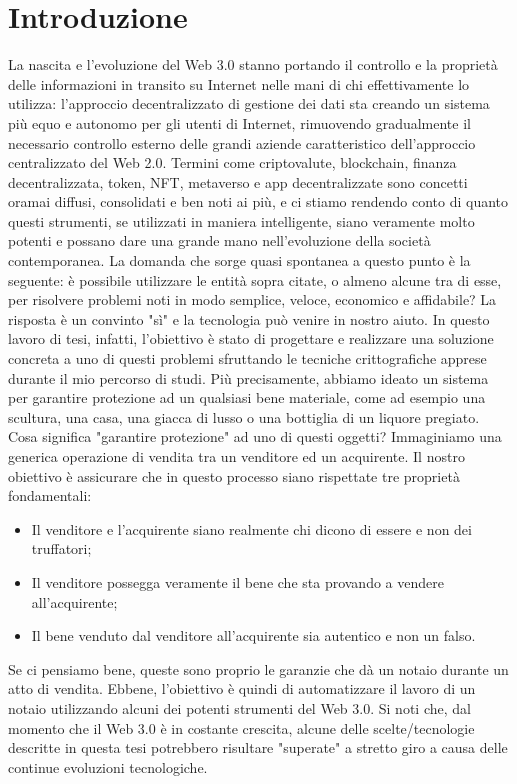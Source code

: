 \documentclass[12pt]{report}
\begin{document}
\chapter{Introduzione}
\noindent
La nascita e l'evoluzione del Web 3.0 stanno portando il controllo e la proprietà delle informazioni in transito su Internet nelle mani di chi effettivamente lo utilizza: l'approccio decentralizzato di gestione dei dati sta creando un sistema più equo e autonomo per gli utenti di Internet, rimuovendo gradualmente il necessario controllo esterno delle grandi aziende caratteristico dell'approccio centralizzato del Web 2.0.\newline
Termini come criptovalute, blockchain, finanza decentralizzata, token, NFT, metaverso e app decentralizzate sono concetti oramai diffusi, consolidati e ben noti ai più, e ci stiamo rendendo conto di quanto questi strumenti, se utilizzati in maniera intelligente, siano veramente molto potenti e possano dare una grande mano nell'evoluzione della società contemporanea.\newline\newline
La domanda che sorge quasi spontanea a questo punto è la seguente: è possibile utilizzare le entità sopra citate, o almeno alcune tra di esse, per risolvere problemi noti in modo semplice, veloce, economico e affidabile? La risposta è un convinto "sì" e la tecnologia può venire in nostro aiuto.\newline
In questo lavoro di tesi, infatti, l'obiettivo è stato di progettare e realizzare una soluzione concreta a uno di questi problemi sfruttando le tecniche crittografiche apprese durante il mio percorso di studi. Più precisamente, abbiamo ideato un sistema per garantire protezione ad un qualsiasi bene materiale, come ad esempio una scultura, una casa, una giacca di lusso o una bottiglia di un liquore pregiato.\newpage
\noindent
Cosa significa "garantire protezione" ad uno di questi oggetti? Immaginiamo una generica operazione di vendita tra un venditore ed un acquirente. Il nostro obiettivo è assicurare che in questo processo siano rispettate tre proprietà fondamentali:
\begin{itemize}[topsep=5pt, itemsep=0pt]
    \item Il venditore e l'acquirente siano realmente chi dicono di essere e non dei truffatori;
    \item Il venditore possegga veramente il bene che sta provando a vendere all'acquirente;
    \item Il bene venduto dal venditore all'acquirente sia autentico e non un falso.
\end{itemize}
Se ci pensiamo bene, queste sono proprio le garanzie che dà un notaio durante un atto di vendita. Ebbene, l'obiettivo è quindi di automatizzare il lavoro di un notaio utilizzando alcuni dei potenti strumenti del Web 3.0.\newline\newline
Si noti che, dal momento che il Web 3.0 è in costante crescita, alcune delle scelte/tecnologie descritte in questa tesi potrebbero risultare "superate" a stretto giro a causa delle continue evoluzioni tecnologiche.
\end{document}
